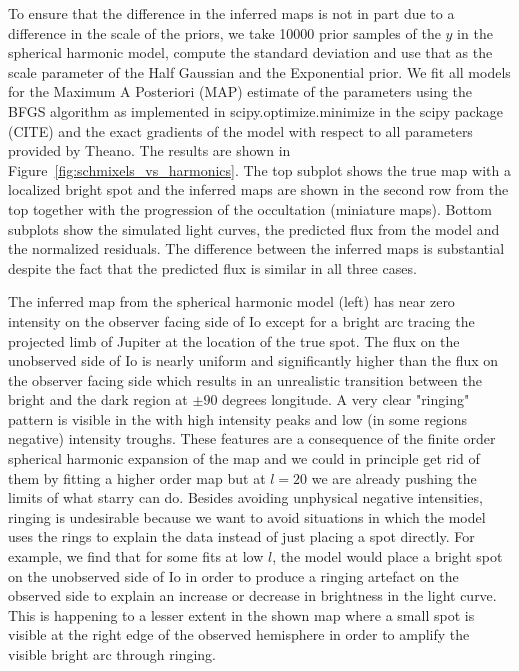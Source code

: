 \documentclass[modern]{aastex62}
\begin{document}
To ensure that the difference in the inferred maps is not in part due to a difference in the scale of the priors, we take 10000 prior samples of the $y$ in the spherical harmonic model, compute the standard deviation and use that as the scale parameter of the Half Gaussian and the Exponential prior.
We fit all models for the Maximum A Posteriori (MAP) estimate of the parameters using the
\textsf{BFGS} algorithm as implemented in \textsf{scipy.optimize.minimize} in the \textsf{scipy} package (CITE) and the exact gradients of the model with respect to all parameters provided by \textsf{Theano}. 
The results are shown in Figure~\ref{fig:schmixels_vs_harmonics}.
The top subplot shows the true map with a localized bright spot and the 
inferred maps are shown in the second row from the top together with the progression of the occultation (miniature maps). 
Bottom subplots show the simulated light curves, the predicted flux from the model and the normalized residuals.
The difference between the inferred maps is substantial despite the fact that the predicted flux is similar in all three cases.

The inferred map from the spherical harmonic model (left) has near zero intensity on the observer facing side of Io except for a bright arc tracing the projected limb of Jupiter at the location of the true spot.
The flux on the unobserved side of Io is nearly uniform and significantly higher than the flux on the observer facing side which results in an unrealistic transition between the bright and the dark region at $\pm 90$ degrees longitude. 
A very clear "ringing" pattern is visible in the with high intensity peaks and low (in some regions negative) intensity troughs.
These features are a consequence of the finite order spherical harmonic expansion of the map and we could in principle get rid of them by fitting a higher order map but at $l=20$ we are already pushing the limits of what \textsf{starry} can do.
Besides avoiding unphysical negative intensities, ringing is undesirable because we want to avoid situations in which the model uses the rings to explain the data instead of just placing a spot directly. 
For example, we find that for some fits at low $l$, the model would place a bright spot on the unobserved side of Io in order to produce a ringing artefact on the observed side to explain an increase or decrease in brightness in the light curve. 
This is happening to a lesser extent in the shown map where a small spot is visible at the right edge of the observed hemisphere in order to amplify the visible bright arc through ringing.
\end{document}
